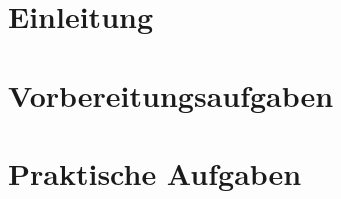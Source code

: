 % 

\newcommand{\institut}{Institut f\"ur Telekommunikationssysteme}
\newcommand{\fachgebiet}{Nachrichten\"ubertragung}
\newcommand{\veranstaltung}{Praktikum Nachrichten\"ubertragung}
\newcommand{\pdfautor}{\"Ozg\"u Dogan (326 048), Boris Henckell (325 779)}
\newcommand{\autor}{\"Ozg\"u Dogan (326 048)\\ Boris Henckell (325 779)}
\newcommand{\gruppe}{Gruppe: }


\newcommand{\pdftitle}{Nachrichten\"ubertragung\ Praktikum\ 01}
\newcommand{\prototitle}{Praktikum 01 \\ Einf\"uhrung in MATLAB}




\section{Einleitung}




\section{Vorbereitungsaufgaben}

    \begin{quote}
   	
       
	\end{quote}
         	


\section{Praktische Aufgaben}

    \begin{quote}
        
		
\end{quote}	


